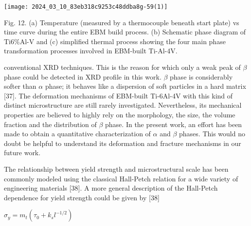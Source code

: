 \documentclass[10pt]{article}
\begin{document}
\begin{center}
\texttt{[image: 2024\_03\_10\_83eb318c9253c48ddba8g-59(1)]}
\end{center}

Fig. 12. (a) Temperature (measured by a thermocouple beneath start plate) vs time curve during the entire EBM build process. (b) Schematic phase diagram of Ti6\%Al-V and (c) simplified thermal process showing the four main phase transformation processes involved in EBM-built Ti-Al-4V.

conventional XRD techniques. This is the reason for which only a weak peak of $\beta$ phase could be detected in XRD profile in this work. $\beta$ phase is considerably softer than $\alpha$ phase; it behaves like a dispersion of soft particles in a hard matrix [37]. The deformation mechanisms of EBM-built Ti-6Al-4V with this kind of distinct microstructure are still rarely investigated. Nevertheless, its mechanical properties are believed to highly rely on the morphology, the size, the volume fraction and the distribution of $\beta$ phase. In the present work, an effort has been made to obtain a quantitative characterization of $\alpha$ and $\beta$ phases. This would no doubt be helpful to understand its deformation and fracture mechanisms in our future work.

The relationship between yield strength and microstructural scale has been commonly modeled using the classical Hall-Petch relation for a wide variety of engineering materials [38]. A more general description of the Hall-Petch dependence for yield strength could be given by [38]

$\sigma_{y}=m_{t}\left(\tau_{0}+k_{s} l^{-1 / 2}\right)$
\end{document}
